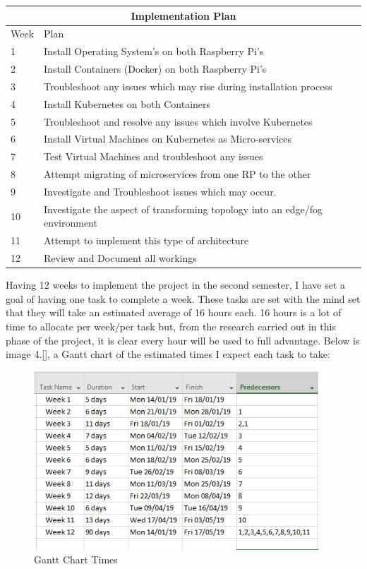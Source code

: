 \vspace{5mm}
\begin{tabular}{ |p{1cm}|p{6cm}| }
 \hline
 \multicolumn{2}{|c|}{Implementation Plan} \\
 \hline
 Week & Plan\\
 \hline
 1   & Install Operating System's on both Raspberry Pi's \\
 \hline
 2  &  Install Containers (Docker) on both Raspberry Pi's\\
 \hline
 3 & Troubleshoot any issues which may rise during installation process\\
 \hline
 4 & Install Kubernetes on both Containers\\
 \hline
 5 & Troubleshoot and resolve any issues which involve Kubernetes\\
 \hline
 6 & Install Virtual Machines on Kubernetes as Micro-services\\
 \hline
 7 & Test Virtual Machines and troubleshoot any issues\\
 \hline
 8 & Attempt migrating of microservices from one RP to the other \\
 \hline
 9 & Investigate and Troubleshoot issues which may occur. \\
 \hline
 10 & Investigate the aspect of transforming topology into an edge/fog environment \\
 \hline
 11 & Attempt to implement this type of architecture \\
 \hline
 12 & Review and Document all workings\\
\hline
\end{tabular}

\pagebreak
Having 12 weeks to implement the project in the second semester, I have set a goal of having one task to complete a week. These tasks are set with the mind set that they will take an estimated average of 16 hours each. 16 hours is a lot of time to allocate per week/per task but, from the research carried out in this phase of the project, it is clear every hour will be used to full advantage. Below is image 4.[], a Gantt chart of the estimated times I expect each task to take: 
\vspace{8mm}

\begin{figure}[ht]
    \centering
     \includegraphics[width=0.95\textwidth]{Figures/ProjectPlan.PNG}
  \caption[Gantt chart Times]{Gantt Chart Times \cite{Reference19}}
 \label{fig:Gantt chart Times}
\end{figure}

